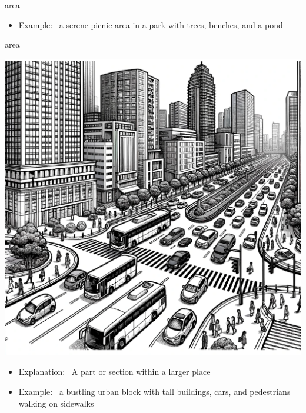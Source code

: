 \documentclass[avery5371, grid,frame]{flashcards}
\begin{document}
\begin{flashcard}{area}
\begin{center}
\begin{minipage}[c]{.45\textwidth}
\begin{itemize}
            \item Example: \ a serene picnic area in a park with trees, benches, and a pond
            \end{itemize}
        \end{minipage}
    \end{center}
    \vspace*{\fill}
\end{flashcard}\begin{flashcard}{area}
    \vspace*{\fill}
    \begin{center}
        \begin{minipage}[c]{.45\textwidth}
            \includegraphics[width=\textwidth]{cards/a/area/area - a bustling urban block with tall buildings, cars, and pedestrians walking on sidewalks.png}
        \end{minipage}
        \begin{minipage}[c]{.45\textwidth}
            \begin{itemize}\setlength\itemsep{12pt}
            \item Explanation: \ A part or section within a larger place

            \item Example: \ a bustling urban block with tall buildings, cars, and pedestrians walking on sidewalks
            \end{itemize}
        \end{minipage}
    \end{center}
    \vspace*{\fill}
\end{flashcard}
\end{document}
